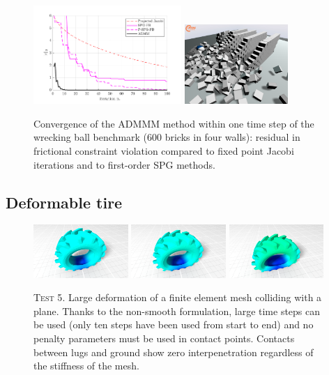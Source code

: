 \documentclass{svproc}
\begin{document}
\begin{figure}[!tbp]
\centering
\includegraphics[width=0.50\textwidth]{t8_convergence.pdf}
\includegraphics[width=0.35\textwidth, trim=0cm -3cm 0 3cm]{t8_snapshot.png}
\caption{Convergence of the ADMMM method within one time step of the wrecking ball benchmark (600 bricks in four walls): residual in frictional constraint violation compared to fixed point Jacobi iterations and to first-order SPG methods.}
\label{fig:t8}
\end{figure}


\subsection{Deformable tire}

\begin{figure}[!tbp]
  \centering
	\includegraphics[width=0.32\textwidth]{tire_5.png}
  \includegraphics[width=0.32\textwidth]{tire_10.png}
	\includegraphics[width=0.32\textwidth]{tire_20.png}
	\hfill
  \caption{\textsc{Test 5}. Large deformation of a finite element mesh colliding with a plane. Thanks to the non-smooth formulation, large time steps can be used (only ten steps have been used from start to end) and no penalty parameters must be used in contact points. Contacts between lugs and ground show zero interpenetration regardless of the stiffness of the mesh.}
	\label{fig:tire}
\end{figure}
\end{document}
